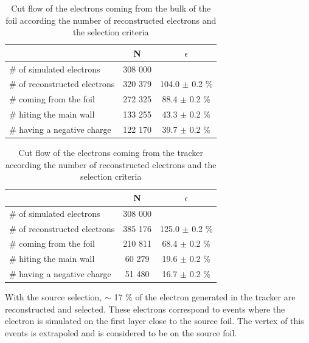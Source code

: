 \documentclass[main.tex]{subfiles}
\begin{document}
\begin{table}[h!]
\begin{center}
\begin{tabular}{l|c|c}
 & N & $\epsilon$ \\
\toprule
$\#$ of simulated electrons & 308 000 & \\
\hline
$\#$ of reconstructed electrons & 320 379 & 104.0 $\pm$ 0.2 \% \\
$\#$ coming from the foil       & 272 325 & 88.4  $\pm$ 0.2 \% \\
$\#$ hiting the main wall       & 133 255 & 43.3  $\pm$ 0.2 \% \\
$\#$ having a negative charge   & 122 170 & 39.7  $\pm$ 0.2 \% \\
\bottomrule
\end{tabular}
\end{center}
\caption{Cut flow of the electrons coming from the bulk of the foil according the number of reconstructed electrons and the selection criteria}
\label{Cutflowelectronbulk}
\end{table}


\begin{table}[h!]
\begin{center}
\begin{tabular}{l|c|c}
 & N & $\epsilon$ \\
\toprule
$\#$ of simulated electrons & 308 000 & \\
\hline
$\#$ of reconstructed electrons & 385 176 & 125.0 $\pm$ 0.2 \% \\
$\#$ coming from the foil       & 210 811 & 68.4  $\pm$ 0.2 \%\\
$\#$ hiting the main wall       & 60 279  & 19.6  $\pm$ 0.2 \%\\
$\#$ having a negative charge   & 51 480  & 16.7  $\pm$ 0.2 \%\\
\bottomrule
\end{tabular}
\end{center}
\caption{Cut flow of the electrons coming from the tracker according the number of reconstructed electrons and the selection criteria}
\label{Cutflowelectrontrackercomingfromthesource}
\end{table}


\bigskip


\noindent With the source selection, $\sim$ 17 \% of the electron generated in the tracker are reconstructed and selected. These electrons correspond to events where the electron is simulated on the first layer close to the source foil. The vertex of this events is extrapoled and is considered to be on the source foil.
\end{document}
